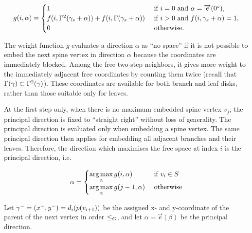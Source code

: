 \begin{equation*}
g(i, \alpha) = \begin{cases}
    1 & \text{ if } i=0 \text{ and } \alpha = \overrightarrow e(0^\circ), \\
    f(i, \Gamma^2(\gamma_s + \alpha)) + f(i, \Gamma(\gamma_s + \alpha)) & \text{ if } i>0 \text{ and } f(i, \gamma_s + \alpha) = 1, \\
    0 & \text{ otherwise.}
\end{cases}
\end{equation*}

The weight function $g$ evaluates a direction $\alpha$ as ``no space'' if it is not possible to embed the next spine vertex in direction $\alpha$ because the coordinates are immediately blocked.
Among the free two-step neighbors, it gives more weight to the immediately adjacent free coordinates by counting them twice (recall that $\Gamma(\gamma) \subset \Gamma^2(\gamma)$). These coordinates are available for both branch and leaf disks, rather than those suitable only for leaves.

At the first step only, when there is no maximum embedded spine vertex $v_j$, the principal direction is fixed to ``straight right'' without loss of generality.
The principal direction is evaluated only when embedding a spine vertex. The same principal direction then applies for embedding all adjacent branches and their leaves. Therefore, the direction which maximises the free space at index $i$ is the principal direction, i.e. 

\begin{equation*}
\alpha = \begin{cases}\underset{\alpha}{\arg \max}\, g(i, \alpha) & \text{ if $v_i \in S$}\\
\underset{\alpha}{\arg \max}\, g(j-1, \alpha) & \text{ otherwise}
\end{cases}
\end{equation*}

Let $\gamma^- = (x^-, y^-) = d_i(p(v_{i+1}))$ be the assigned x- and y-coordinate of the parent of the next vertex in order $\leq_G$, and let $\alpha = \overrightarrow e(\beta)$ be the principal direction.

